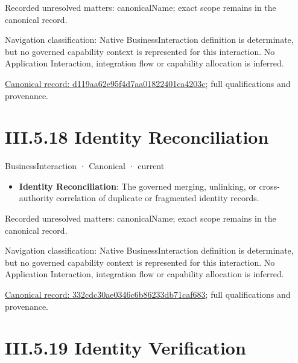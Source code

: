 {\small Recorded unresolved matters: canonicalName; exact scope remains in the canonical record.}\par
{\small Navigation classification: Native BusinessInteraction definition is determinate, but no governed capability context is represented for this interaction. No Application Interaction, integration flow or capability allocation is inferred.}\par
{\footnotesize \href{../../../../continuum/business/business-interaction/d119aa62e95f4d7aa01822401ca4203c.md}{Canonical record: d119aa62e95f4d7aa01822401ca4203c}; full qualifications and provenance.}\par
\section*{III.5.18 Identity Reconciliation}
\label{navigation:III.5.18}

\label{element:332cdc30ae0346c6b86233db71caf683}
{\small BusinessInteraction · Canonical · current}\par

\begin{itemize}


\item \textbf{Identity Reconciliation}: The governed merging, unlinking, or cross-authority correlation of duplicate or fragmented identity records.

\end{itemize}

{\small Recorded unresolved matters: canonicalName; exact scope remains in the canonical record.}\par
{\small Navigation classification: Native BusinessInteraction definition is determinate, but no governed capability context is represented for this interaction. No Application Interaction, integration flow or capability allocation is inferred.}\par
{\footnotesize \href{../../../../continuum/business/business-interaction/332cdc30ae0346c6b86233db71caf683.md}{Canonical record: 332cdc30ae0346c6b86233db71caf683}; full qualifications and provenance.}\par
\section*{III.5.19 Identity Verification}
\label{navigation:III.5.19}

